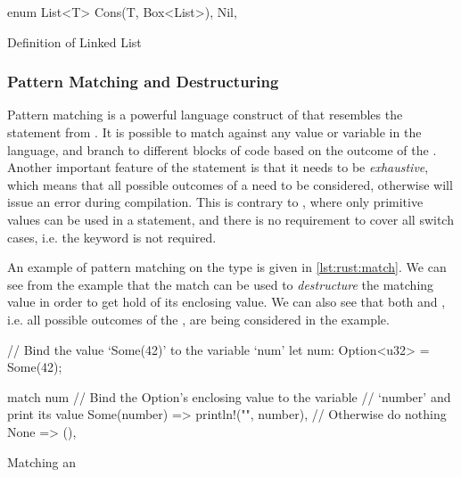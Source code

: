 \begin{listing}[H]
  \begin{rustcode}
enum List<T> {
  Cons(T, Box<List>),
  Nil,
}
  \end{rustcode}
  \caption{Definition of Linked List}
  \label{lst:rust:list}
\end{listing}

\subsubsection{Pattern Matching and Destructuring}
\label{sub:pattern_matching}

Pattern matching is a powerful language construct of {\rust} that resembles the  statement from {\C}.
It is possible to match against any value or variable in the language, and branch to different blocks of code based on the outcome of the .
Another important feature of the  statement is that it needs to be \emph{exhaustive}, which means that all possible outcomes of a  need to be considered, otherwise {\rust} will issue an error during compilation.
This is contrary to {\C}, where only primitive values can be used in a  statement, and there is no requirement to cover all switch cases, i.e. the  keyword is not required.

An example of pattern matching on the  type is given in \autoref{lst:rust:match}.
We can see from the example that the match can be used to \emph{destructure} the matching value in order to get hold of its enclosing value.
We can also see that both  and , i.e. all possible outcomes of the , are being considered in the example.

\begin{listing}[H]
  \begin{rustcode}
// Bind the value `Some(42)' to the variable `num'
let num: Option<u32> = Some(42);

match num {
  // Bind the Option's enclosing value to the variable
  // `number' and print its value
  Some(number) => println!("{}", number),
  // Otherwise do nothing
  None => (),
}
  \end{rustcode}
  \caption{Matching an }
  \label{lst:rust:match}
\end{listing}

